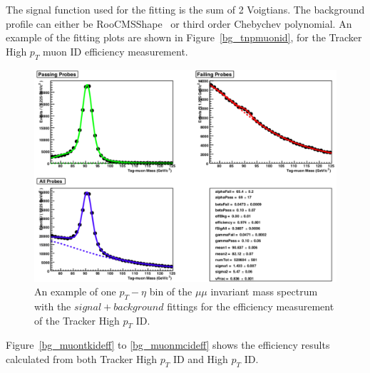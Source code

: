 \vspace{0.3cm}
The signal function used for the fitting is the sum of 2 Voigtians. The background profile can either be RooCMSShape~\cite{bg_cmsshape} or third order Chebychev polynomial. An example of the fitting plots are shown in Figure~\ref{bg_tnpmuonid}, for the Tracker High $p_T$ muon ID efficiency measurement.
\begin{figure}[htbp]
\begin{center}
\includegraphics[width=0.9\linewidth]{figures/bg_tnpmuonid.png}
\caption{An example of one $p_T - \eta$ bin of the $\mu\mu$ invariant mass spectrum with the $signal+background$ fittings for the efficiency measurement of the Tracker High $p_T$ ID.}
\label{fig:bg_tnpmuonid}
\end{center}
\end{figure}

\vspace{0.3cm}
Figure~\ref{bg_muontkideff} to \ref{bg_muonmcideff} shows the efficiency results calculated from both Tracker High $p_T$ ID and High $p_T$ ID.


